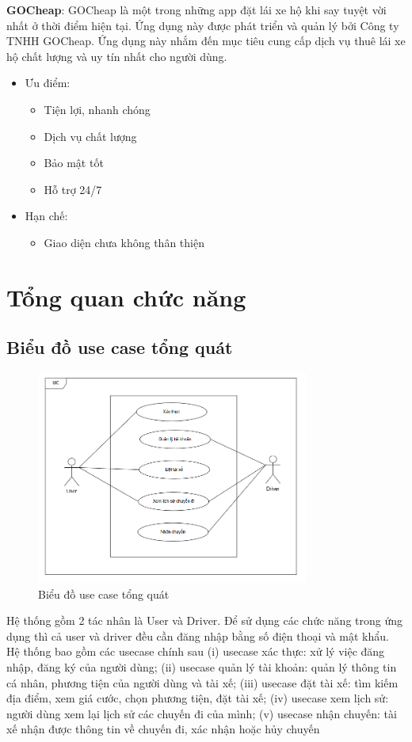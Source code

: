 \documentclass[../DoAn.tex]{subfiles}
\begin{document}
\textbf{GOCheap}: GOCheap là một trong những app đặt lái xe hộ khi say tuyệt vời nhất ở thời điểm hiện tại. Ứng dụng này được phát triển và quản lý bởi Công ty TNHH GOCheap. Ứng dụng này nhắm đến mục tiêu cung cấp dịch vụ thuê lái xe hộ chất lượng và uy tín nhất cho người dùng.
\begin{itemize}
    \item Ưu điểm:
      \begin{itemize}
        \item Tiện lợi, nhanh chóng
        \item Dịch vụ chất lượng
        \item Bảo mật tốt
        \item Hỗ trợ 24/7
      \end{itemize}
    \item Hạn chế:
      \begin{itemize}
        \item Giao diện chưa không thân thiện
      \end{itemize}
\end{itemize}


\section{Tổng quan chức năng}
\label{section:2.2}

\subsection{Biểu đồ use case tổng quát}
\label{subsection:2.2.1}
\begin{figure}[H]
    \centering
    \includegraphics[width=0.8\textwidth]{Hinhve/Usecase_tong_quan.png}
    \caption{Biểu đồ use case tổng quát}
    \label{fig:use_case_total}
\end{figure}
Hệ thống gồm 2 tác nhân là User và Driver.
Để sử dụng các chức năng trong ứng dụng thì cả user và driver đều cần đăng nhập bằng số điện thoại và mật khẩu.
Hệ thống bao gồm các usecase chính sau (i) usecase xác thực: xử lý việc đăng nhập, đăng ký của người dùng; 
(ii) usecase quản lý tài khoản: quản lý thông tin cá nhân, phương tiện của người dùng và tài xế;
(iii) usecase đặt tài xế: tìm kiếm địa điểm, xem giá cước, chọn phương tiện, đặt tài xế;
(iv) usecase xem lịch sử: người dùng xem lại lịch sử các chuyến đi của mình;
(v) usecase nhận chuyến: tài xế nhận được thông tin về chuyến đi, xác nhận hoặc hủy chuyến
\end{document}

